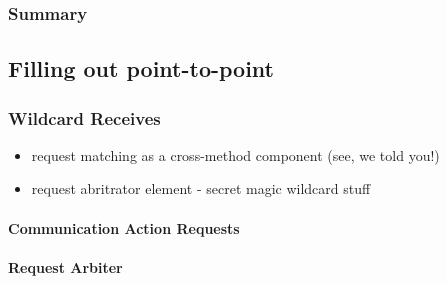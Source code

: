 
\subsubsection{Summary}



\subsection{Filling out point-to-point}

\subsubsection{Wildcard Receives}
\begin{itemize}
  \item request matching as a cross-method component (see, we told you!)
  \item request abritrator element - secret magic wildcard stuff
\end{itemize}

\paragraph{Communication Action Requests}

\paragraph{Request Arbiter}

%


